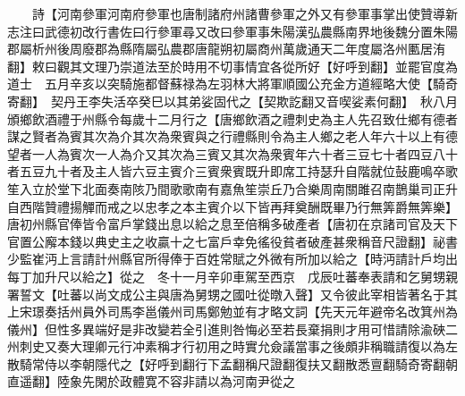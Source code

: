 　　詩【河南參軍河南府參軍也唐制諸府州諸曹參軍之外又有參軍事掌出使贊導新志注曰武德初改行書佐曰行參軍尋又改曰參軍事朱陽漢弘農縣南界地後魏分置朱陽郡屬析州後周廢郡為縣隋屬弘農郡唐龍朔初屬商州萬歲通天二年度屬洛州匭居洧翻】敕曰觀其文理乃崇道法至於時用不切事情宜各從所好【好呼到翻】並罷官度為道士　五月辛亥以突騎施都督蘇禄為左羽林大將軍順國公充金方道經略大使【騎奇寄翻】　契丹王李失活卒癸巳以其弟娑固代之【契欺訖翻又音喫娑素何翻】　秋八月頒鄉飲酒禮于州縣令每歲十二月行之【唐鄉飲酒之禮刺史為主人先召致仕鄉有德者謀之賢者為賓其次為介其次為衆賓與之行禮縣則令為主人鄉之老人年六十以上有德望者一人為賓次一人為介又其次為三賓又其次為衆賓年六十者三豆七十者四豆八十者五豆九十者及主人皆六豆主賓介三賓衆賓既升即席工持瑟升自階就位鼔鹿鳴卒歌笙入立於堂下北面奏南陔乃間歌歌南有嘉魚笙崇丘乃合樂周南關雎召南鵲巢司正升自西階贊禮揚觶而戒之以忠孝之本主賓介以下皆再拜奠酬既畢乃行無筭爵無筭樂】　唐初州縣官俸皆令富戶掌錢出息以給之息至倍稱多破產者【唐初在京諸司官及天下官置公廨本錢以典史主之收贏十之七富戶幸免徭役貧者破產甚衆稱音尺證翻】祕書少監崔沔上言請計州縣官所得俸于百姓常賦之外微有所加以給之【時沔請計戶均出每丁加升尺以給之】從之　冬十一月辛卯車駕至西京　戊辰吐蕃奉表請和乞舅甥親署誓文【吐蕃以尚文成公主與唐為舅甥之國吐從暾入聲】又令彼此宰相皆著名于其上宋璟奏括州員外司馬李邕儀州司馬鄭勉並有才略文詞【先天元年避帝名改箕州為儀州】但性多異端好是非改變若全引進則咎悔必至若長棄捐則才用可惜請除渝硤二州刺史又奏大理卿元行冲素稱才行初用之時實允僉議當事之後頗非稱職請復以為左散騎常侍以李朝隱代之【好呼到翻行下孟翻稱尺證翻復扶又翻散悉亶翻騎奇寄翻朝直遥翻】陸象先閑於政體寛不容非請以為河南尹從之

